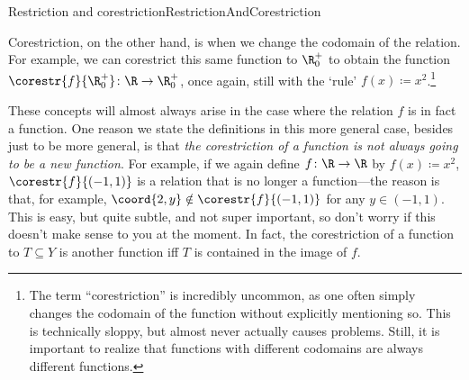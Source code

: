 \begin{dfn}{Restriction and corestriction}{RestrictionAndCorestriction}
\begin{rmk}
Corestriction, on the other hand, is when we change the codomain of the relation.  For example, we can corestrict this same function to $\R _0^+$ to obtain the function $\corestr{f}{\R _0^+}\colon \R \rightarrow \R _0^+$, once again, still with the `rule' $f(x)\coloneqq x^2$.\footnote{The term ``corestriction'' is incredibly uncommon, as one often simply changes the codomain of the function without explicitly mentioning so.  This is technically sloppy, but almost never actually causes problems.  Still, it is important to realize that functions with different codomains are always different functions.}
\end{rmk}
\begin{rmk}
These concepts will almost always arise in the case where the relation $f$ is in fact a function.  One reason we state the definitions in this more general case, besides just to be more general, is that \emph{the corestriction of a function is not always going to be a new function}.  For example, if we again define $f\colon \R \rightarrow \R$ by $f(x)\coloneqq x^2$, $\corestr{f}{(-1,1)}$ is a relation that is no longer a function---the reason is that, for example, $\coord{2,y}\notin \corestr{f}{(-1,1)}$ for any $y\in (-1,1)$.  This is easy, but quite subtle, and not super important, so don't worry if this doesn't make sense to you at the moment.  In fact, the corestriction of a function to $T\subseteq Y$ is another function iff $T$ is contained in the image of $f$.
\end{rmk}
\end{dfn}

